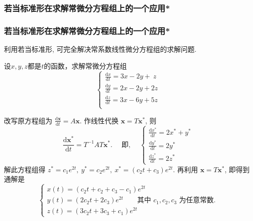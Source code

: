 \subsubsection{若当标准形在求解常微分方程组上的一个应用*}
\begin{frame}\frametitle{若当标准形在求解常微分方程组上的一个应用*}
利用若当标准形, 可完全解决常系数线性微分方程组的求解问题.

\pp

\begin{example}
设$x,y,z$都是$t$的函数，求解常微分方程组
\begin{equation*}
\begin{cases}
\frac{\mathrm{d}x}{\mathrm{d}t}  = 3x - 2y + \ z\\
\frac{\mathrm{d}y}{\mathrm{d}t}  = 2x - 2y + 2z\\
\frac{\mathrm{d}z}{\mathrm{d}t}  = 3x - 6y + 5z\\
\end{cases}
\end{equation*}
\end{example}
\pp
\bigskip


改写原方程组为 $\frac{\mathrm{d}\mathbf{x}}{\mathrm{d}t} = A\mathbf{x}$. 作线性代换 $\mathbf{x} = T\mathbf{x}^*$, 则
\[\frac{\mathrm{d}\mathbf{x}^*}{\mathrm{d}t} = T^{-1}AT\mathbf{x}^*. \quad \text{ 即, } \quad
\begin{cases}
\frac{\mathrm{d}x^*}{\mathrm{d}t} = 2x^* + y^* \\
\frac{\mathrm{d}y^*}{\mathrm{d}t} = 2y^* \\
\frac{\mathrm{d}z^*}{\mathrm{d}t} = 2z^*
\end{cases}
\]
解此方程组得 $z^* = c_1e^{2t},\ y^* = c_2e^{2t},\ x^* = (c_2t + c_3)e^{2t}.$
再利用 $\mathbf{x} = T\mathbf{x}^*$, 即得到通解是
\[
\begin{cases}
x(t) = (c_2t + c_2 + c_3 - c_1)e^{2t} \\
y(t) = (2c_2t + 2c_3)e^{2t}  \qquad \text{其中 $c_1, c_2, c_3$ 为任意常数.}\\
z(t) = (3c_2t + 3c_3 + c_1)e^{2t}
\end{cases}
\]







\end{frame}





